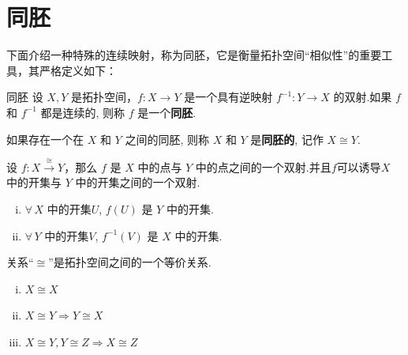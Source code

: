 \section{同胚}

下面介绍一种特殊的连续映射，称为同胚，它是衡量拓扑空间“相似性”的重要工具，其严格定义如下：

\begin{definition}{同胚}
    设 $X,Y$ 是拓扑空间，$f:X\to Y$ 是一个具有逆映射 $f^{-1}:Y\to X$ 的双射.如果 $f$ 和 $f^{-1}$ 都是连续的, 则称 $f$ 是一个\textbf{同胚}.\par
    如果存在一个在 $X$ 和 $Y$ 之间的同胚, 则称 $X$ 和 $Y$ 是\textbf{同胚的}, 记作 $X\cong Y$.
\end{definition}

\begin{remark}
    设 $f:X\stackrel{\cong}{\longrightarrow} Y$，那么 $f$ 是 $X$ 中的点与 $Y$ 中的点之间的一个双射.并且$f$可以诱导$X$ 中的开集与 $Y$ 中的开集之间的一个双射.
    \begin{enumerate}[(i)]
        \item $\forall\, X$ 中的开集$U$, $f(U)$ 是 $Y$ 中的开集.\par
        [$f^{-1}:Y\to X$ 是连续的 $\Rightarrow (f^{-1})^{-1}(U)$ 在 $Y$ 中是开集, 即 $f(U)$ 在 $Y$ 中是开集]
        \item $\forall\, Y$ 中的开集$V$, $f^{-1}(V)$ 是 $X$ 中的开集.\par
        [$f:X\to Y$ 是连续的 $\Rightarrow f^{-1}(V)$ 在 $X$ 中是开集]
    \end{enumerate}
\end{remark}

\begin{proposition}
    关系“$\cong$”是拓扑空间之间的一个等价关系.
    \begin{enumerate}[(i)]
        \item $X\cong X$
        \item $X\cong Y \Rightarrow Y\cong X$
        \item $X\cong Y, Y\cong Z \Rightarrow X\cong Z$
    \end{enumerate}
\end{proposition}

